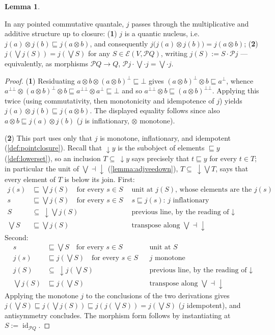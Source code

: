 \documentclass{article}
\makeatletter
\newcommand{\allproofs}{} %
\newif\ifproofsinappendix
\newcommand{\lemmawithproof}[3]{%
  \begin{lemma}\label{#1}
    #2  
    \ifproofsinappendix \hyperref[xxx#1]{(Proof)} \fi
  \end{lemma}
    \ifproofsinappendix
  \g@addto@macro\allproofs{%
    \par\medskip
    \noindent
    \subsection*{\cref{#1}}\par
    #2\par
    \begin{proof}\label{xxx#1}
      #3
    \end{proof}%
  }
      \else

    \begin{proof}
      #3
    \end{proof}
    \fi 
}
\theoremstyle{definition}
\newtheorem{lemma}{Lemma}[section]
\newcommand{\cE}{\mathcal{E}}
\newcommand{\cP}{\mathcal{P}}
\newcommand{\id}{\operatorname{id}}
\makeatother
\begin{document}
\lemmawithproof{lemma:nucleus}{
In any pointed commutative quantale, $j$ passes through the multiplicative and additive structure up to closure:
({\bf 1}) $j$ is a quantic nucleus, i.e.\ $j(a)\otimes j(b)\sqsubseteq j(a\otimes b)$, and consequently
$j\big(j(a)\otimes j(b)\big)=j(a\otimes b)$;
({\bf 2}) $j(\bigvee j(S))=j(\bigvee S)$ for any $S\in\cE(V,\cP Q)$, writing $j(S):=S\cdot\cP j$ --- equivalently, as morphisms $\cP Q\to Q$, $\cP j\cdot\bigvee\cdot j=\bigvee\cdot j$.
}{
({\bf 1}) Residuating $a\otimes b\otimes(a\otimes b)^{\bot}\sqsubseteq\bot$ gives
$(a\otimes b)^{\bot}\otimes b\sqsubseteq a^{\bot}$, whence
$a^{\bot\bot}\otimes(a\otimes b)^{\bot}\otimes b
\sqsubseteq a^{\bot\bot}\otimes a^{\bot}\sqsubseteq\bot$
and so $a^{\bot\bot}\otimes b\sqsubseteq(a\otimes b)^{\bot\bot}$. Applying
this twice (using commutativity, then monotonicity and idempotence of $j$)
yields $j(a)\otimes j(b)\sqsubseteq j(a\otimes b)$. The displayed equality
follows since also $a\otimes b\sqsubseteq j(a)\otimes j(b)$ ($j$ is
inflationary, $\otimes$ monotone).

({\bf 2}) This part uses only that $j$ is monotone, inflationary, and idempotent (\cref{def:pointclosure}). Recall that $\downarrow\! y$ is the subobject of elements $\sqsubseteq y$ (\cref{def:lowerset}), so an inclusion $T\subseteq\ \downarrow\! y$ says precisely that $t\sqsubseteq y$ for every $t\in T$; in particular the unit of $\bigvee\dashv\downarrow$ (\cref{lemma:adjveedown}), $T\subseteq\ \downarrow\!\bigvee T$, says that every element of $T$ is below its join. First:
\begin{align*}
j(s) &\sqsubseteq \textstyle\bigvee j(S) \quad\text{for every } s \in S && \text{unit at } j(S)\text{, whose elements are the } j(s)\\
s &\sqsubseteq \textstyle\bigvee j(S) \quad\text{for every } s \in S && s \sqsubseteq j(s)\text{: } j \text{ inflationary}\\
S &\subseteq\ \downarrow\!\textstyle\bigvee j(S) && \text{previous line, by the reading of } \downarrow\\
\textstyle\bigvee S &\sqsubseteq \textstyle\bigvee j(S) && \text{transpose along } \bigvee\dashv\downarrow
\end{align*}
Second:
\begin{align*}
s &\sqsubseteq \textstyle\bigvee S \quad\text{for every } s \in S && \text{unit at } S\\
j(s) &\sqsubseteq j(\textstyle\bigvee S) \quad\text{for every } s \in S && j \text{ monotone}\\
j(S) &\subseteq\ \downarrow\! j(\textstyle\bigvee S) && \text{previous line, by the reading of } \downarrow\\
\textstyle\bigvee j(S) &\sqsubseteq j(\textstyle\bigvee S) && \text{transpose along } \bigvee\dashv\downarrow
\end{align*}
Applying the monotone $j$ to the conclusions of the two derivations gives $j(\bigvee S)\sqsubseteq j(\bigvee j(S))\sqsubseteq j(j(\bigvee S))=j(\bigvee S)$ ($j$ idempotent), and antisymmetry concludes. The morphism form follows by instantiating at $S:=\id_{\cP Q}$.
}
\end{document}

